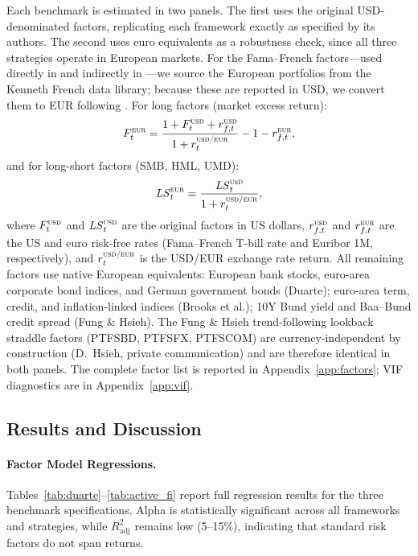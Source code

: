 Each benchmark is estimated in two panels. The first uses the original
USD-denominated factors, replicating each framework exactly as specified
by its authors. The second uses euro equivalents as a robustness check,
since all three strategies operate in European markets.
For the Fama--French factors---used directly in
\citet{duarte2007risk} and indirectly in \citet{fung2004hedge}---we source
the European portfolios from the Kenneth French data library; because
these are reported in USD, we convert them to EUR following
\citet{gluck2021currency}. For long factors (market excess return):
\begin{equation}\label{eq:gluck_long}
  F_{t}^{\textsc{eur}}
  = \frac{1 + F_{t}^{\textsc{usd}} + r_{f,t}^{\textsc{usd}}}
         {1 + r_{t}^{\textsc{usd/eur}}}
  - 1 - r_{f,t}^{\textsc{eur}},
\end{equation}
and for long-short factors (SMB, HML, UMD):
\begin{equation}\label{eq:gluck_ls}
  \mathit{LS}_{t}^{\textsc{eur}}
  = \frac{\mathit{LS}_{t}^{\textsc{usd}}}
         {1 + r_{t}^{\textsc{usd/eur}}},
\end{equation}
where $F_{t}^{\textsc{usd}}$ and $\mathit{LS}_{t}^{\textsc{usd}}$ are
the original factors in US dollars, $r_{f,t}^{\textsc{usd}}$ and
$r_{f,t}^{\textsc{eur}}$ are the US and euro risk-free rates
(Fama--French T-bill rate and Euribor 1M, respectively), and
$r_{t}^{\textsc{usd/eur}}$ is the USD/EUR exchange rate return.
All remaining factors use native European equivalents: European bank
stocks, euro-area corporate bond indices, and German government bonds
(Duarte); euro-area term, credit, and inflation-linked indices
(Brooks et al.); 10Y Bund yield and Baa--Bund credit spread
(Fung \& Hsieh). The Fung \& Hsieh trend-following lookback straddle
factors (PTFSBD, PTFSFX, PTFSCOM) are currency-independent by
construction (D.~Hsieh, private communication) and are therefore
identical in both panels. The complete factor list is reported in
Appendix~\ref{app:factors}; VIF diagnostics are in Appendix~\ref{app:vif}. 


\subsection{Results and Discussion}
\label{sec:bench_results}

\paragraph{Factor Model Regressions.}
Tables~\ref{tab:duarte}--\ref{tab:active_fi} report full
regression results for the three benchmark specifications. Alpha is
statistically significant across all frameworks and strategies, while
$R^2_{\mathrm{adj}}$ remains low (5--15\%), indicating that standard risk
factors do not span returns.

